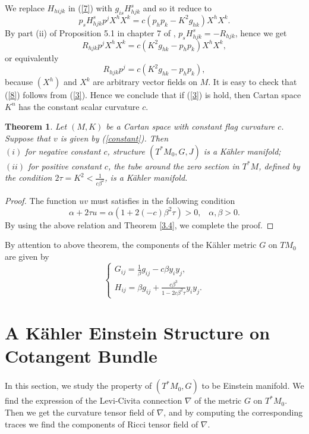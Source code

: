 \documentclass[10pt,a4paper]{article}
\theoremstyle{plain}
\newtheorem{theorem}{Theorem}[section]
\theoremstyle{definition}
\begin{document}
We replace $H_{hijk}$ in (\ref{7}) with $g_{is}H^s_{hjk}$ and so it
reduce to
\begin{equation}
p_sH^s_{hjk}p^jX^hX^k=c(p_hp_k-K^2g_{hk})X^hX^k.\label{8}
\end{equation}
By part (ii) of Proposition 5.1 in chapter 7 of \cite{MirHri},
$p_sH^s_{hjk}=-R_{hjk}$, hence we get
\[
R_{hjk}p^jX^hX^k=c(K^2g_{hk}-p_hp_k)X^hX^k,
\]
or equivalently
\begin{equation}
R_{hjk}p^j=c(K^2g_{hk}-p_hp_k),\label{8}
\end{equation}
because $(X^h)$ and $X^k$ are arbitrary vector fields on $M$. It is
easy to check that (\ref{8}) follows from (\ref{3}). Hence we
conclude that if (\ref{3}) is hold, then Cartan space $K^n$ has the
constant scalar curvature $c$.
\begin{theorem}\label{THM1}
Let $(M,K)$ be a Cartan space with constant flag curvature $c$. Suppose that $v$ is given by (\ref{constant}). Then\\
$(i)$ for negative constant $c$, structure $(T^{\ast}M_0,G,J)$ is a K\"{a}hler manifold;\\
$(ii)$ for positive constant $c$, the tube around the zero section
in $T^{\ast}M$, defined by the condition $2\tau=K^2<\frac{1}{c\beta^2}$,  is a K\"{a}hler manifold.
\end{theorem}
\begin{proof}
The function  $uv$  must satisfies in the following condition
\begin{equation}
\alpha +2\tau u=\alpha (1+2(-c)\beta ^{2} \tau )>0,\, \, \, \, \,
\alpha ,\beta >0.
\end{equation}
By using the above relation and Theorem \ref{3.4}, we complete the proof.
\end{proof}

\bigskip

By attention to above theorem, the components of the K\"{a}hler
metric $G$ on $TM_0$ are given by
\begin{equation}
\left\{\begin{array}{l} {G_{ij} =\frac{1}{\beta } g_{ij} -c\beta
y_{i}y_{j} ,} \\ {H_{ij} =\beta g_{ij}+\frac{c\beta ^{3} }{1-2c\beta
^{2} \tau } y_{i}y_{j} .}
\end{array}\right.\label{Kahler}
\end{equation}
\section{A K\"{a}hler Einstein Structure on Cotangent Bundle}
In this section, we study the property of $(T^{\ast}M_0,G)$ to be
Einstein manifold.  We find the expression of the Levi-Civita connection $\nabla$ of the metric $G$ on $T^{\ast}M_0$. Then we get  the curvature tensor field of $\nabla$, and  by computing the corresponding traces we find the components of Ricci tensor field of   $\nabla$.
\end{document}
